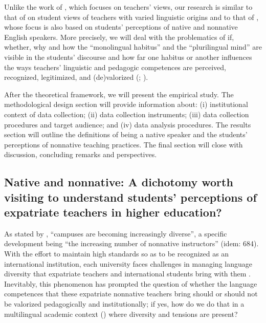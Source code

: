 \documentclass[output=paper]{../langscibook}
\begin{document}
Unlike the work of \citet{Medgyes1992,Medgyes1994}, which focuses on teachers’ views, our research is similar to that of \citet{LiChuaChenVanTienNguyen2011} on student views of teachers with varied linguistic origins and to that of \citet{LasagabasterSierra2002}, whose focus is also based on students’ perceptions of native and nonnative English speakers. More precisely, we will deal with the problematics of if, whether, why and how the “monolingual habitus” \citep{Gogolin2008} and the “plurilingual mind” \citep{Menghini2017} are visible in the students’ discourse and how far one habitus or another influences the ways teachers’ linguistic and pedagogic competences are perceived, recognized, legitimized, and (de)valorized (\citealt{Kramsch1997}; \citealt{ClarkParan2007}).

After the theoretical framework, we will present the empirical study. The methodological design section will provide information about: (i) institutional context of data collection; (ii) data collection instruments; (iii) data collection procedures and target audience; and (iv) data analysis procedures. The results section will outline the definitions of being a native speaker and the students’ perceptions of nonnative teaching practices. The final section will close with discussion, concluding remarks and perspectives.

\subsection{Native and nonnative: A dichotomy worth visiting to understand students’ perceptions of expatriate teachers in higher education?}

As stated by \citet[683]{KangEtAl2015}, “campuses are becoming increasingly diverse”, a specific development being “the increasing number of nonnative instructors” (idem: 684). With the effort to maintain high standards so as to be recognized as an international institution, each university faces challenges in managing language diversity that expatriate teachers and international students bring with them \citep{Yanaprasart2018}. Inevitably, this phenomenon has prompted the question of whether the language competences that these expatriate nonnative teachers bring should or should not be valorized pedagogically and institutionally; if yes, how do we do that in a multilingual academic context (\citealt{BlommaertVerschueren1998}) where diversity and tensions are present?
\end{document}
